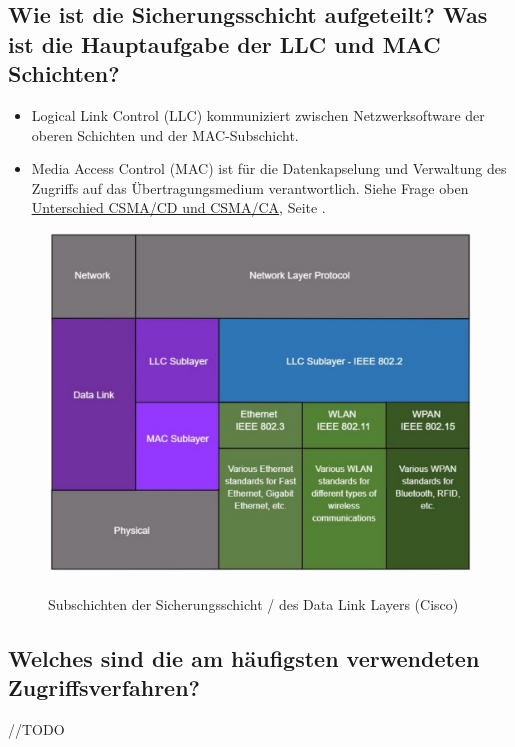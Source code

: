 \pagebreak
\subsection*{Wie ist die Sicherungsschicht aufgeteilt? Was ist die Hauptaufgabe der LLC und MAC Schichten?}\label{sub:LLC_MAC}
\begin{itemize}
    \item Logical Link Control (LLC) kommuniziert zwischen Netzwerksoftware der oberen Schichten und der MAC-Subschicht.
    \item Media Access Control (MAC) ist für die Datenkapselung und Verwaltung des Zugriffs auf das Übertragungsmedium verantwortlich. Siehe Frage oben \underline{\hyperref[sub:csma]{Unterschied CSMA/CD und CSMA/CA}}, Seite \pageref{sub:csma}.
\end{itemize}

\begin{figure}[H]
    \begin{center}
    \label{pic:DataLinkLayer_LLC_MAC}
    \includegraphics[width=\textwidth]{images/DLL_Sublayers.jpg}
    \caption{Subschichten der Sicherungsschicht / des Data Link Layers (\textsuperscript{\textcopyright}Cisco)}
    \end{center}
\end{figure}

\subsection*{Welches sind die am häufigsten verwendeten Zugriffsverfahren?}
//TODO

